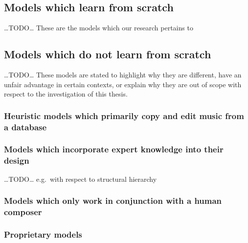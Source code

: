 \documentclass[12pt,a4paper,]{report}
\begin{document}
\hypertarget{models-which-learn-from-scratch}{%
\subsection{Models which learn from
scratch}\label{models-which-learn-from-scratch}}

\ldots TODO\ldots{} These are the models which our research pertains to

\hypertarget{models-which-do-not-learn-from-scratch}{%
\subsection{Models which do not learn from
scratch}\label{models-which-do-not-learn-from-scratch}}

\ldots TODO\ldots{} These models are stated to highlight why they are
different, have an unfair advantage in certain contexts, or explain why
they are out of scope with respect to the investigation of this thesis.

\hypertarget{heuristic-models-which-primarily-copy-and-edit-music-from-a-database}{%
\subsubsection{Heuristic models which primarily copy and edit music from
a
database}\label{heuristic-models-which-primarily-copy-and-edit-music-from-a-database}}

\hypertarget{models-which-incorporate-expert-knowledge-into-their-design}{%
\subsubsection{Models which incorporate expert knowledge into their
design}\label{models-which-incorporate-expert-knowledge-into-their-design}}

\ldots TODO\ldots{} e.g.~with respect to structural hierarchy

\hypertarget{models-which-only-work-in-conjunction-with-a-human-composer}{%
\subsubsection{Models which only work in conjunction with a human
composer}\label{models-which-only-work-in-conjunction-with-a-human-composer}}

\hypertarget{proprietary-models}{%
\subsubsection{Proprietary models}\label{proprietary-models}}
\end{document}
